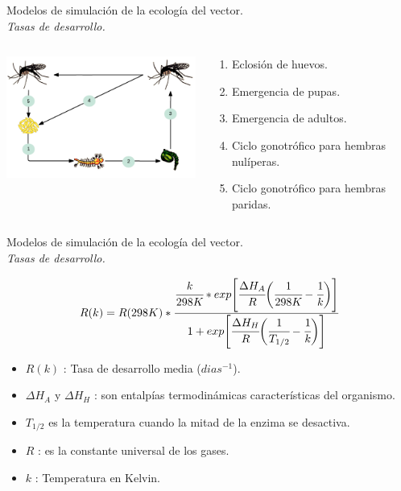 \begin{frame}[c]{Modelos de simulación de la ecología del vector.\\\textit{Tasas de desarrollo.}}
  \begin{center}
   \begin{columns}[T]
        \begin{column}[T]{6.5cm}
            \includegraphics[width=7cm]{./graphics/tasas-desarrollo.png}
        \end{column}
        \begin{column}[T]{5cm}
          \begin{enumerate}
            \item Eclosión de huevos.
            \item Emergencia de pupas.
            \item Emergencia de adultos.
            \item Ciclo gonotrófico para hembras nulíperas.
            \item Ciclo gonotrófico para hembras paridas.
          \end{enumerate}
        \end{column}
    \end{columns}
  \end{center}
\end{frame}

\begin{frame}[t]{Modelos de simulación de la ecología del vector.\\\textit{Tasas de desarrollo.}}
  \begin{center}
      \begin{equation} \label{eq:schoolfield}
         R(k)  = R(298K) *\cfrac{ \cfrac{k}{298K} *
          exp \Bigg[
                  \cfrac{\Delta H_{A}}{R} \bigg(\cfrac{1}{298K} - \cfrac{1}{k}\bigg)
              \Bigg]}
          {1 + exp\Bigg[\cfrac{\Delta H_{H}}{R} \bigg(\cfrac{1}{T_{1/2}}- \cfrac{1}{k}\bigg)\Bigg] }
      \end{equation}
  \end{center}
   \begin{itemize}
      \item $R(k)$ : Tasa de desarrollo media ($dias^{-1}$).
      \item $\Delta H_{A}$ y $\Delta H_{H}$ : son entalpías termodinámicas características del organismo.
      \item $T_{1/2}$ es la temperatura cuando la mitad de la enzima se desactiva.
      \item $R$ : es la constante universal de los gases.
      \item $k$ : Temperatura en Kelvin.
    \end{itemize}
\end{frame}


